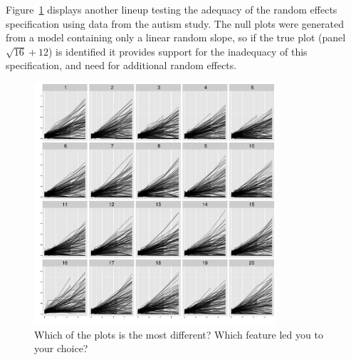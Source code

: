 \documentclass[12pt]{article} %
\begin{document}
Figure~\ref{fig:autism-ranef} displays another lineup testing the adequacy of the random effects specification using data from the autism study. The null plots were generated from a model containing only a linear random slope, so if the true plot (panel $\sqrt{16} + 12$) is identified it provides support for the inadequacy of this specification, and need for additional random effects. %

\begin{figure}
	\centering
	\includegraphics[width=0.8\textwidth]{autism-fanned2-16.pdf}
	\caption{\label{fig:autism-ranef} Which of the plots is the most different? Which feature led you to your choice? }
\end{figure}

\end{document}
